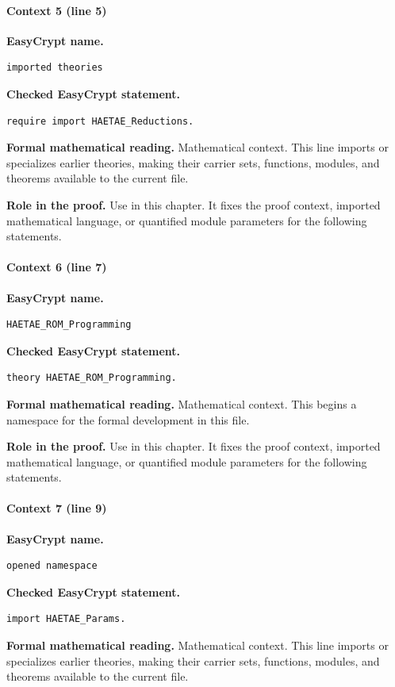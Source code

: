 \paragraph{Context 5 (line 5)}
\noindent\textbf{EasyCrypt name.}
\begin{lstlisting}[language=EasyCrypt,basicstyle=\ttfamily\scriptsize]
imported theories
\end{lstlisting}
\noindent\textbf{Checked EasyCrypt statement.}
\begin{lstlisting}[language=EasyCrypt,basicstyle=\ttfamily\scriptsize]
require import HAETAE_Reductions.
\end{lstlisting}
\noindent\textbf{Formal mathematical reading.}
Mathematical context. This line imports or specializes earlier theories, making their carrier sets, functions, modules, and theorems available to the current file.

\noindent\textbf{Role in the proof.}
Use in this chapter. It fixes the proof context, imported mathematical language, or quantified module parameters for the following statements.

\paragraph{Context 6 (line 7)}
\noindent\textbf{EasyCrypt name.}
\begin{lstlisting}[language=EasyCrypt,basicstyle=\ttfamily\scriptsize]
HAETAE_ROM_Programming
\end{lstlisting}
\noindent\textbf{Checked EasyCrypt statement.}
\begin{lstlisting}[language=EasyCrypt,basicstyle=\ttfamily\scriptsize]
theory HAETAE_ROM_Programming.
\end{lstlisting}
\noindent\textbf{Formal mathematical reading.}
Mathematical context. This begins a namespace for the formal development in this file.

\noindent\textbf{Role in the proof.}
Use in this chapter. It fixes the proof context, imported mathematical language, or quantified module parameters for the following statements.

\paragraph{Context 7 (line 9)}
\noindent\textbf{EasyCrypt name.}
\begin{lstlisting}[language=EasyCrypt,basicstyle=\ttfamily\scriptsize]
opened namespace
\end{lstlisting}
\noindent\textbf{Checked EasyCrypt statement.}
\begin{lstlisting}[language=EasyCrypt,basicstyle=\ttfamily\scriptsize]
import HAETAE_Params.
\end{lstlisting}
\noindent\textbf{Formal mathematical reading.}
Mathematical context. This line imports or specializes earlier theories, making their carrier sets, functions, modules, and theorems available to the current file.

